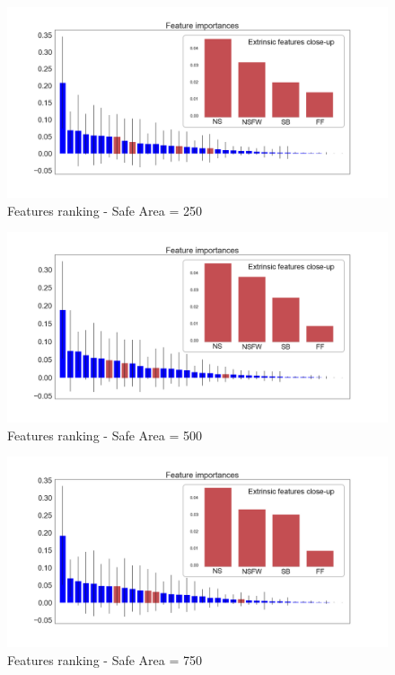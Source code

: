 \begin{figure}[htp!]
	\includegraphics[width=\columnwidth]{chapter4/figure/features_importances_250.png}
	\caption{Features ranking - Safe Area = 250}
	\label{fig:250_overall}
\end{figure}
\begin{figure}[htp!]
	\includegraphics[width=\columnwidth]{chapter4/figure/features_importances_500.png}
	\caption{Features ranking - Safe Area = 500}
	\label{fig:500_overall}
\end{figure}
\begin{figure}[htp!]
	\includegraphics[width=\columnwidth]{chapter4/figure/features_importances_750.png}
	\caption{Features ranking - Safe Area = 750}
	\label{fig:750_overall}
\end{figure}

